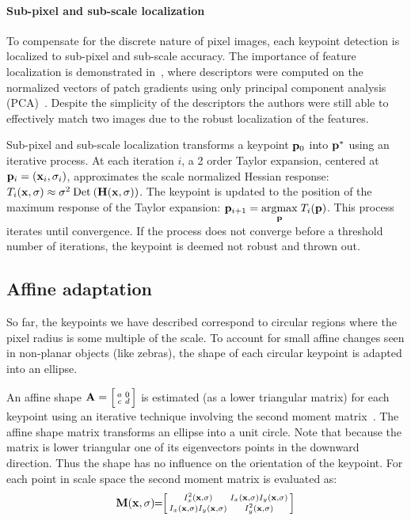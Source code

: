         \paragraph{Sub-pixel and sub-scale localization}
            To compensate for the discrete nature of pixel images, each keypoint detection is localized to
            sub-pixel and sub-scale accuracy. The importance of feature localization is demonstrated
            in~\cite{ke_pca_sift_2004}, where descriptors were computed on the normalized vectors of patch gradients
            using only principal component analysis (PCA)~\cite{jolliffe_principal_2014}. Despite the simplicity of
            the descriptors the authors were still able to effectively match two images due to the robust
            localization of the features.

            Sub-pixel and sub-scale localization transforms a keypoint $\mathbf{p}_0$ into $\mathbf{p}^*$ using an iterative
            process. At each iteration $i$, a 2\nd{} order Taylor expansion, centered at %
            $\mathbf{p}_i = (\mathbf{x}_i, \sigma_i)$, approximates the scale normalized Hessian response: %
            $T_i(\mathbf{x}, \sigma) \approx \sigma^2 \mathbin{\textrm{Det}}\left(\mathbf{H}(\mathbf{x}, \sigma)\right)$. The keypoint is updated to the position of the
            maximum response of the Taylor expansion: $\mathbf{p}_{i + 1} = \underset{\mathbf{p}}{\operatorname{argmax}}\; T_i(\mathbf{p})$. This process iterates
            until convergence. If the process does not converge before a threshold number of iterations, the
            keypoint is deemed not robust and thrown out.

    \subsection{Affine adaptation}
        So far, the keypoints we have described correspond to circular regions where the pixel radius is some
        multiple of the scale. To account for small affine changes seen in non-planar objects (like zebras), the
        shape of each circular keypoint is adapted into an ellipse.

        An affine shape $\mathbf{A}= \Bigl[ \begin{smallmatrix} a & 0\\c & d \end{smallmatrix} \Bigr] $ is estimated (as a lower triangular matrix) for each keypoint using an
        iterative technique involving the second moment
        matrix~\cite{lindeberg_shape_adapted_1997,baumberg_reliable_2000,mikolajczyk_comparison_2005}. The affine
        shape matrix transforms an ellipse into a unit circle. Note that because the matrix is lower triangular one
        of its eigenvectors points in the downward direction. Thus the shape has no influence on the orientation of
        the keypoint. For each point in scale space the second moment matrix is evaluated as:
        \begin{equation}\label{eqn:secondmoment}
                \mathbf{M}(\mathbf{x}, \sigma) 
                \mkern-6mu=\mkern-6mu 
                 \Bigl[ \begin{smallmatrix}  
                I_x^2(\mathbf{x}, \sigma)      & I_x(\mathbf{x}, \sigma) I_y(\mathbf{x}, \sigma) \\
                I_x(\mathbf{x}, \sigma) I_y(\mathbf{x}, \sigma) & I_y^2(\mathbf{x}, \sigma)  \end{smallmatrix} \Bigr] 
        \end{equation}

